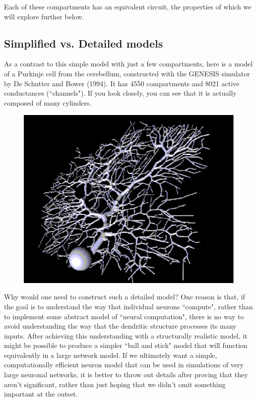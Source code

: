 \documentclass[12pt]{article}
\begin{document}
Each of these compartments has an equivalent circuit, the properties of which we will explore further below.

\subsection*{Simplified vs. Detailed models}

As a contrast to this simple model with just a few compartments, here is a model of a Purkinje cell from the cerebellum, constructed with the GENESIS simulator by De Schutter and Bower (1994). It has 4550 compartments and 8021 active conductances (``channels"). If you look closely, you can see that it is actually composed of many cylinders.

\begin{figure}[h]
  \centering
 \includegraphics[scale=0.5]{figs/purkcell.eps}
  \label{fig:purkcell}
\end{figure}

Why would one need to construct such a detailed model? One reason is that, if the goal is to understand the way that individual neurons ``compute", rather than to implement some abstract model of ``neural computation", there is no way to avoid understanding the way that the dendritic structure processes its many inputs. After achieving this understanding with a structurally realistic model, it might be possible to produce a simpler ``ball and stick" model that will function equivalently in a large network model. If we ultimately want a simple, computationally efficient neuron model that can be used in simulations of very large neuronal networks, it is better to throw out details after proving that they aren't significant, rather than just hoping that we didn't omit something important at the outset. 
\end{document}
